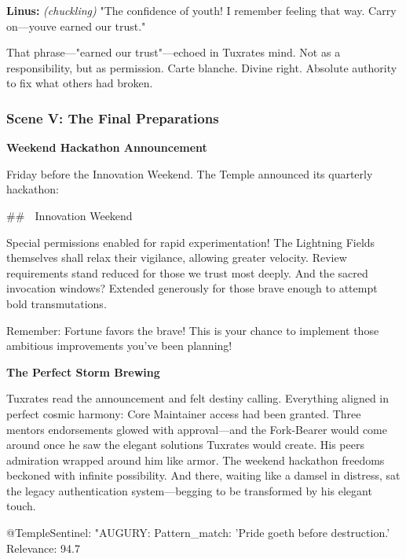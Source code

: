 \textbf{Linus:} \emph{(chuckling)} "The confidence of youth! I remember feeling that way. Carry on---you\textquotesingle ve earned our trust."

That phrase---"earned our trust"---echoed in Tuxrates\textquotesingle{} mind. Not as a responsibility, but as permission. Carte blanche. Divine right. Absolute authority to fix what others had broken.

\bookdivider

\subsubsection{Scene V: The Final Preparations}\label{scene-v-the-final-preparations}

\textbf{Weekend Hackathon Announcement}

Friday before the Innovation Weekend. The Temple announced its quarterly hackathon:

\begin{codeblock}
## 🚀 Innovation Weekend 🚀

Special permissions enabled for rapid experimentation!
The Lightning Fields themselves shall relax their vigilance, allowing greater velocity. Review requirements stand reduced for those we trust most deeply. And the sacred invocation windows? Extended generously for those brave enough to attempt bold transmutations.

Remember: Fortune favors the brave! This is your chance to 
implement those ambitious improvements you've been planning!
\end{codeblock}

\textbf{The Perfect Storm Brewing}

Tuxrates read the announcement and felt destiny calling. Everything aligned in perfect cosmic harmony: Core Maintainer access had been granted. Three mentors\textquotesingle{} endorsements glowed with approval---and the Fork-Bearer would come around once he saw the elegant solutions Tuxrates would create. His peers\textquotesingle{} admiration wrapped around him like armor. The weekend hackathon freedoms beckoned with infinite possibility. And there, waiting like a damsel in distress, sat the legacy authentication system---begging to be transformed by his elegant touch.

\begin{codeblock}
@TempleSentinel: "AUGURY: Pattern_match: 'Pride goeth before destruction.' Relevance: 94.7%
\end{codeblock}

